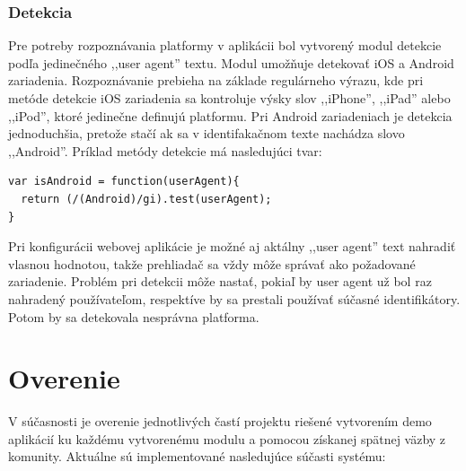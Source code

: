 \subsubsection{Detekcia} %
\label{ssub:detekcia}

Pre potreby rozpoznávania platformy v aplikácii bol vytvorený modul detekcie podľa jedinečného ,,user agent'' textu. Modul umožňuje detekovať iOS a Android zariadenia. Rozpoznávanie prebieha na základe regulárneho výrazu, kde pri metóde detekcie iOS zariadenia sa kontroluje výsky slov ,,iPhone'', ,,iPad'' alebo ,,iPod'', ktoré jedinečne definujú platformu. Pri Android zariadeniach je detekcia jednoduchšia, pretože stačí ak sa v identifakačnom texte nachádza slovo ,,Android''. Príklad metódy detekcie má nasledujúci tvar:

\begin{lstlisting}
var isAndroid = function(userAgent){
  return (/(Android)/gi).test(userAgent);
}
\end{lstlisting}

Pri konfigurácii webovej aplikácie je možné aj aktálny ,,user agent'' text nahradiť vlasnou hodnotou, takže prehliadač sa vždy môže správať ako požadované zariadenie. Problém pri detekcii môže nastať, pokiaľ by user agent už bol raz nahradený používateľom, respektíve by sa prestali používať súčasné identifikátory. Potom by sa detekovala nesprávna platforma.




\section{Overenie} %
\label{sec:overenie}

V súčasnosti je overenie jednotlivých častí projektu riešené vytvorením demo aplikácií ku každému vytvorenému modulu a pomocou získanej spätnej väzby z komunity. Aktuálne sú implementované nasledujúce súčasti systému:

